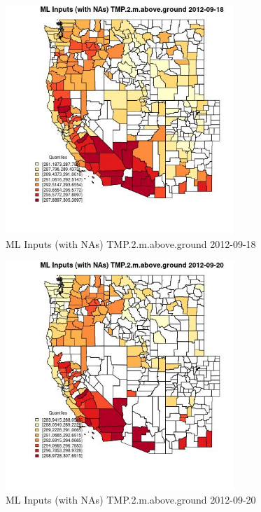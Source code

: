 \begin{figure} 
\centering  
\includegraphics[width=0.77\textwidth]{Code_Outputs/Report_ML_input_PM25_Step4_part_e_de_duplicated_aves_compiled_2019-05-14wNAs_CountyTMP2mabovegroundMean2012-09-18_2012-09-18.jpg} 
\caption{\label{fig:Report_ML_input_PM25_Step4_part_e_de_duplicated_aves_compiled_2019-05-14wNAsCountyTMP2mabovegroundMean2012-09-18_2012-09-18}ML Inputs (with NAs) TMP.2.m.above.ground 2012-09-18} 
\end{figure} 
 

\begin{figure} 
\centering  
\includegraphics[width=0.77\textwidth]{Code_Outputs/Report_ML_input_PM25_Step4_part_e_de_duplicated_aves_compiled_2019-05-14wNAs_CountyTMP2mabovegroundMean2012-09-20_2012-09-20.jpg} 
\caption{\label{fig:Report_ML_input_PM25_Step4_part_e_de_duplicated_aves_compiled_2019-05-14wNAsCountyTMP2mabovegroundMean2012-09-20_2012-09-20}ML Inputs (with NAs) TMP.2.m.above.ground 2012-09-20} 
\end{figure} 
 

